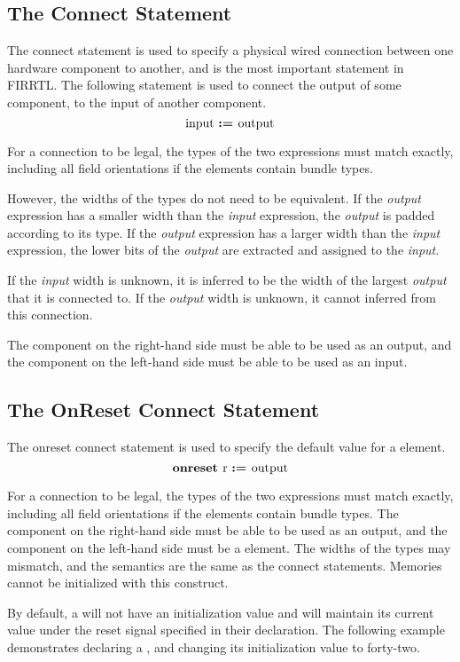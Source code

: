 \documentclass[12pt]{article}
\begin{document}
\subsection{The Connect Statement}
The connect statement is used to specify a physical wired connection between one hardware component to another, and is the most important statement in FIRRTL.
The following statement is used to connect the output of some component, to the input of another component. 
\[
\text{input } \text{\bf :=\ } \text{output} 
\]

For a connection to be legal, the types of the two expressions must match exactly, including all field orientations if the elements contain bundle types.

However, the widths of the types do not need to be equivalent.
If the {\em output} expression has a smaller width than the {\em input} expression, the {\em output} is padded according to its type.
If the {\em output} expression has a larger width than the {\em input} expression, the lower bits of the {\em output} are extracted and assigned to the {\em input}.

If the {\em input} width is unknown, it is inferred to be the width of the largest {\em output} that it is connected to.
If the {\em output} width is unknown, it cannot inferred from this connection.

The component on the right-hand side must be able to be used as an output, and the component on the left-hand side must be able to be used as an input.

\subsection{The OnReset Connect Statement}
The onreset connect statement is used to specify the default value for a  element.
\[
\text{\bf onreset\ } \text{r } \text{\bf :=\ } \text{output} 
\]

For a connection to be legal, the types of the two expressions must match exactly, including all field orientations if the elements contain bundle types.
The component on the right-hand side must be able to be used as an output, and the component on the left-hand side must be a  element.
The widths of the types may mismatch, and the semantics are the same as the connect statements.
Memories cannot be initialized with this construct.

By default, a  will not have an initialization value and will maintain its current value under the reset signal specified in their declaration.
The following example demonstrates declaring a , and changing its initialization value to forty-two.
\end{document}
